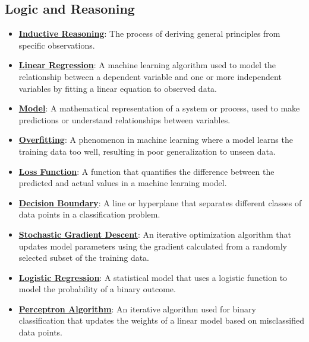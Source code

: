 \documentclass{article}%
\begin{document}
%
\subsection{Logic and Reasoning}%
\label{subsec:LogicandReasoning}%
\begin{itemize}[leftmargin=*]%
\item \href{https://www.math.purdue.edu/~yipn/351/05L2-ML Basics.pdf#page=3}{\textbf{Inductive Reasoning}}: The process of deriving general principles from specific observations.%
\item \href{https://www.math.purdue.edu/~yipn/351/05L2-ML Basics.pdf#page=6}{\textbf{Linear Regression}}: A machine learning algorithm used to model the relationship between a dependent variable and one or more independent variables by fitting a linear equation to observed data.%
\item \href{https://www.math.purdue.edu/~yipn/351/05L2-ML Basics.pdf#page=5}{\textbf{Model}}: A mathematical representation of a system or process, used to make predictions or understand relationships between variables.%
\item \href{https://www.math.purdue.edu/~yipn/351/05L2-ML Basics.pdf#page=14}{\textbf{Overfitting}}: A phenomenon in machine learning where a model learns the training data too well, resulting in poor generalization to unseen data.%
\item \href{https://www.math.purdue.edu/~yipn/351/05L2-ML Basics.pdf#page=25}{\textbf{Loss Function}}: A function that quantifies the difference between the predicted and actual values in a machine learning model.%
\item \href{https://www.math.purdue.edu/~yipn/351/05L2-ML Basics.pdf#page=24}{\textbf{Decision Boundary}}: A line or hyperplane that separates different classes of data points in a classification problem.%
\item \href{https://www.math.purdue.edu/~yipn/351/05L2-ML Basics.pdf#page=29}{\textbf{Stochastic Gradient Descent}}: An iterative optimization algorithm that updates model parameters using the gradient calculated from a randomly selected subset of the training data.%
\item \href{https://www.math.purdue.edu/~yipn/351/05L2-ML Basics.pdf#page=31}{\textbf{Logistic Regression}}: A statistical model that uses a logistic function to model the probability of a binary outcome.%
\item \href{https://www.math.purdue.edu/~yipn/351/05L2-ML Basics.pdf#page=30}{\textbf{Perceptron Algorithm}}: An iterative algorithm used for binary classification that updates the weights of a linear model based on misclassified data points.%

\end{itemize}
\end{document}
